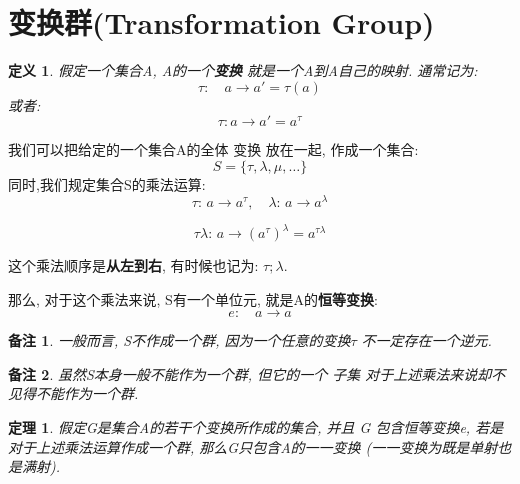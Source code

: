 \documentclass[utf8]{ctexbook}
\newtheorem{theorem}{定理}[section]
\newtheorem{definition}{定义}[section]
\newtheorem{memo}{备注}[section]
\begin{document}
\section{变换群(Transformation Group)}

\begin{definition}
假定一个集合A, A的一个\textbf{变换} 就是一个A到A自己的映射. 通常记为:
\begin{equation}
\tau: \quad a \longrightarrow a' = \tau(a)
\end{equation}
或者:
\begin{equation}
\tau: a \longrightarrow a' = a^{\tau}
\end{equation}
\end{definition}

我们可以把给定的一个集合A的全体 变换 放在一起, 作成一个集合:
\begin{equation}
S = \{ \tau, \lambda, \mu, \ldots  \}
\end{equation}
同时,我们规定集合S的乘法运算:
\begin{equation}
\tau: \, a \longrightarrow a^{\tau}, \quad \lambda: \, a \longrightarrow a^{\lambda}
\end{equation}

\begin{equation}
\tau  \lambda : \, a \longrightarrow (a^{\tau})^{\lambda} = a^{\tau \lambda}
\end{equation}

这个乘法顺序是\textbf{从左到右}, 有时候也记为: $\tau ; \lambda $.

那么, 对于这个乘法来说, S有一个单位元, 就是A的\textbf{恒等变换}:
\begin{equation}
e: \quad a \longrightarrow a
\end{equation}

\begin{memo}
一般而言, S不作成一个群, 因为一个任意的变换$\tau$ 不一定存在一个逆元.
\end{memo}

\begin{memo}
虽然S本身一般不能作为一个群, 但它的一个 {\em 子集} 对于上述乘法来说却不见得不能作为一个群.
\end{memo}

\begin{theorem}
假定G是集合A的若干个变换所作成的集合, 并且 G 包含恒等变换e, 若是对于上述乘法运算作成一个群, 那么G只包含A的一一变换 (一一变换为既是单射也是满射). \label{thm_tau_group_nec_condition}
\end{theorem}
\end{document}
